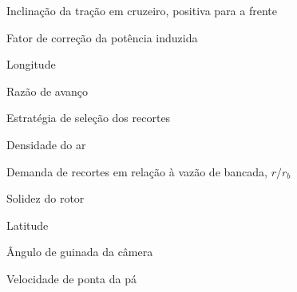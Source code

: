 \begin{simbolos}
  \item[$\theta$]                  Inclinação da tração em cruzeiro, positiva para a frente
  \item[$\kappa$]                  Fator de correção da potência induzida
  \item[$\lambda$]                 Longitude
  \item[$\mu$]                     Razão de avanço
  \item[$\pi$]                     Estratégia de seleção dos recortes
  \item[$\rho$]                    Densidade do ar
  \item[$\rho_b$]                  Demanda de recortes em relação à vazão de bancada, $r/r_b$
  \item[$\sigma$]                  Solidez do rotor
  \item[$\phi$]                    Latitude
  \item[$\psi$]                    Ângulo de guinada da câmera
  \item[$\Omega R$]                Velocidade de ponta da pá
\end{simbolos}
